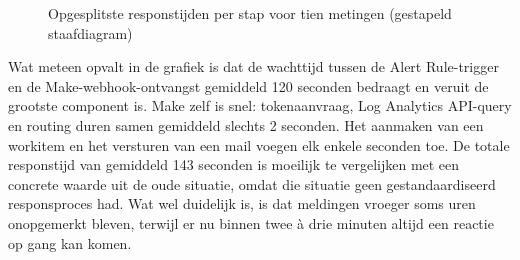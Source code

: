 \begin{figure}[H]
    \centering
    \caption{Opgesplitste responstijden per stap voor tien metingen (gestapeld staafdiagram)}
    \label{fig:responstijd}
\end{figure}

Wat meteen opvalt in de grafiek is dat de wachttijd tussen de Alert Rule-trigger en de Make-webhook-ontvangst gemiddeld 120 seconden bedraagt en veruit de grootste component is. Make zelf is snel: tokenaanvraag, Log Analytics API-query en routing duren samen gemiddeld slechts 2 seconden. Het aanmaken van een workitem en het versturen van een mail voegen elk enkele seconden toe. De totale responstijd van gemiddeld 143 seconden is moeilijk te vergelijken met een concrete waarde uit de oude situatie, omdat die situatie geen gestandaardiseerd responsproces had. Wat wel duidelijk is, is dat meldingen vroeger soms uren onopgemerkt bleven, terwijl er nu binnen twee à drie minuten altijd een reactie op gang kan komen.

